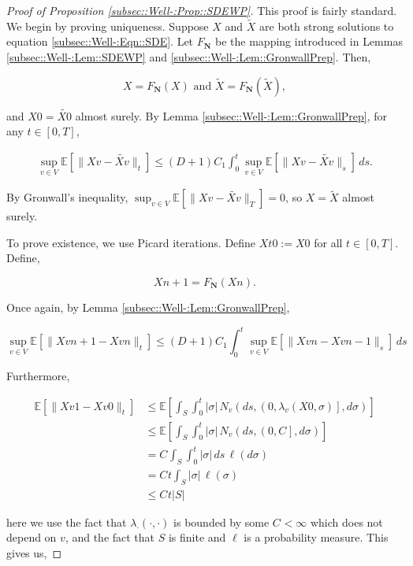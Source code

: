 \documentclass[12pt]{article}
\newcommand{\skipLine}{\vspace{12pt}}
\newcommand{\mb}{\mathbb}
\newcommand{\te}{\text}
\newcommand{\ex}[1]{\mb{E}\left[#1\right]}			%
\newcommand{\defeq}{:=}								%
\renewcommand{\v}{v}							%
\renewcommand{\S}{S}							%
\newcommand{\s}{\sigma}							%
\newcommand{\T}{T}								%
\renewcommand{\t}{t}							%
\renewcommand{\tt}{s}							%
\newcommand{\X}{X}								%
\newcommand{\degr}{D}								%
\newcommand{\poiss}[1]{N_{#1}}						%
\newcommand{\poisses}{\mathbf{N}}				%
\newcommand{\V}{V}									%
\newcommand{\numb}{n}								%
\newcommand{\rate}[1]{\lambda_{#1}}					%
\newcommand{\const}[1]{C_{#1}}						%
\newcommand{\Sm}{\ell}								%
\newcommand{\alt}{\widetilde}						%
\begin{document}
\begin{proof}[Proof of Proposition \ref{subsec::Well-:Prop::SDEWP}]

This proof is fairly standard. We begin by proving uniqueness. Suppose \(\X{}{}\) and \(\alt{\X{}{}}\) are both strong solutions to equation \ref{subsec::Well-:Eqn::SDE}. Let \(F_\poisses\) be the mapping introduced in Lemmas \ref{subsec::Well-:Lem::SDEWP} and \ref{subsec::Well-:Lem::GronwallPrep}. Then,

\[\X{}{} = F_\poisses(\X{}{})\te{ and } \alt{\X{}{}} = F_\poisses(\alt{\X{}{}}),\]

and \(\X{}{0} = \alt{\X{}{0}}\) almost surely. By Lemma \ref{subsec::Well-:Lem::GronwallPrep}, for any \(\t\in [0,\T]\),

\begin{align*}
\sup_{\v\in \V}\ex{\|\X{\v}{} - \alt{\X{\v}{}}\|_\t} \leq (\degr+1)\const{1}\int_0^\t\sup_{\v\in \V} \ex{\|\X{\v}{} - \alt{\X{\v}{}}\|_\tt}\,d\tt.
\end{align*}

By Gronwall's inequality, \(\sup_{\v \in \V} \ex{\|\X{\v}{} - \alt{\X{\v}{}}\|_\T} = 0\), so \(\X{}{} = \alt{\X{}{}}\) almost surely.

\skipLine

To prove existence, we use Picard iterations. Define \(\X{}{\t}{0} \defeq \X{}{0}\) for all \(\t \in [0,\T]\). Define,

\[\X{}{}{\numb+1} = F_\poisses(\X{}{}{\numb}).\]

Once again, by Lemma \ref{subsec::Well-:Lem::GronwallPrep},

\[\sup_{\v \in \V} \ex{\|\X{\v}{}{\numb+1} - \X{\v}{}{\numb}\|_\t} \leq (\degr+1)\const{1} \int_0^\t \sup_{\v \in \V} \ex{\|\X{\v}{}{\numb} - \X{\v}{}{\numb-1}\|_\tt}\,d\tt\] 

Furthermore, 

\begin{align*}
\ex{\|\X{\v}{}{1} - \X{\v}{}{0}\|_\t} &\leq \ex{\int_\S\int_0^\t |\s|\,\poiss{\v}\left(d\tt,\left(0,\rate{\v}(\X{}{0},\s)\right],d\s\right)}\\
&\leq \ex{\int_\S\int_0^\t |\s|\,\poiss{\v}\left(d\tt,\left(0,\const{}\right],d\s\right)}\\
&= \const{}\int_\S\int_0^\t |\s|\,d\tt\,\Sm(d\s)\\
&=\const{}\t\int_\S |\s|\,\Sm(\s)\\
&\leq \const{}\t|\S|
\end{align*}

here we use the fact that \(\rate{\cdot}(\cdot,\cdot)\) is bounded by some \(\const{} < \infty\) which does not depend on \(\v\), and the fact that \(\S\) is finite and \(\Sm\) is a probability measure. This gives us,


\end{proof}
\end{document}
